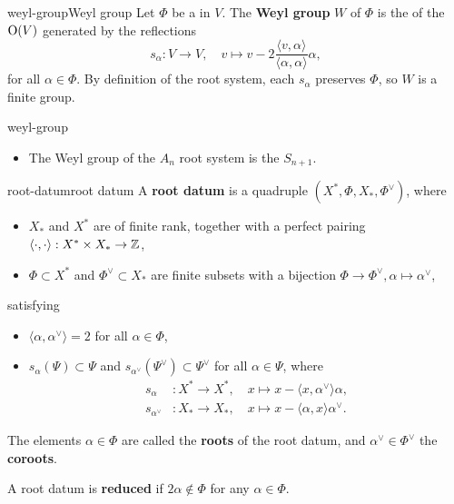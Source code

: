 \begin{topic}{weyl-group}{Weyl group}
    Let $\Phi$ be a  in $V$. The \textbf{Weyl group} $W$ of $\Phi$ is the  of the  $\textup{O}(V)$ generated by the reflections
    \[ s_\alpha : V \to V, \quad v \mapsto v - 2 \frac{\langle v, \alpha \rangle}{\langle \alpha, \alpha \rangle} \alpha , \]
    for all $\alpha \in \Phi$. By definition of the root system, each $s_\alpha$ preserves $\Phi$, so $W$ is a finite group.
\end{topic}

\begin{example}{weyl-group}
    \begin{itemize}
        \item The Weyl group of the $A_n$ root system is the  $S_{n + 1}$.
    \end{itemize}
\end{example}

\begin{topic}{root-datum}{root datum}
    A \textbf{root datum} is a quadruple $(X^*, \Phi, X_*, \Phi^\vee)$, where
    \begin{itemize}
        \item $X_*$ and $X^*$ are  of finite rank, together with a perfect pairing $\langle \cdot, \cdot \rangle : X^* \times X_* \to \mathbb{Z}$,
        \item $\Phi \subset X^*$ and $\Phi^\vee \subset X_*$ are finite subsets with a bijection $\Phi \to \Phi^\vee, \alpha \mapsto \alpha^\vee$,
    \end{itemize}
    satisfying
    \begin{itemize}
        \item $\langle \alpha, \alpha^\vee \rangle = 2$ for all $\alpha \in \Phi$,
        \item $s_\alpha(\Psi) \subset \Psi$ and $s_{\alpha^\vee}(\Psi^\vee) \subset \Psi^\vee$ for all $\alpha \in \Psi$, where
        \[ \begin{aligned}
            s_\alpha &: X^* \to X^*, \quad x \mapsto x - \langle x, \alpha^\vee \rangle \alpha , \\
            s_{\alpha^\vee} &: X_* \to X_*, \quad x \mapsto x - \langle \alpha, x \rangle \alpha^\vee.
        \end{aligned} \]
    \end{itemize}
    The elements $\alpha \in \Phi$ are called the \textbf{roots} of the root datum, and $\alpha^\vee \in \Phi^\vee$ the \textbf{coroots}.
    
    A root datum is \textbf{reduced} if $2 \alpha \not\in \Phi$ for any $\alpha \in \Phi$.
\end{topic}

